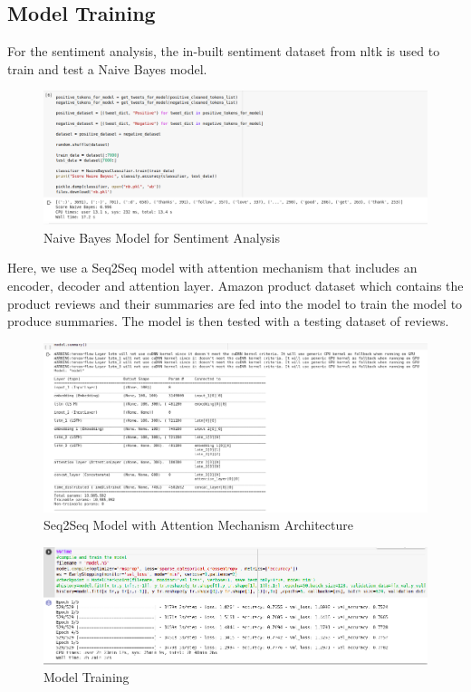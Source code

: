 \documentclass[11pt]{report}
\begin{document}
\subsection{Model Training}
For the sentiment analysis, the in-built sentiment dataset from nltk is used to train and test a Naive Bayes model.
\begin{figure}[H]
\centering
\includegraphics[scale=0.35]{images/sentiment_modeltraining.png}
\caption{Naive Bayes Model for Sentiment Analysis}
\label{fig:sentiment_train}
\end{figure}
Here, we use a Seq2Seq model with attention mechanism that includes an encoder, decoder and attention layer. Amazon product dataset which contains the product reviews and their summaries are fed into the model to train the model to produce summaries. The model is then tested with a testing dataset of reviews.
\begin{figure}[H]
\centering
\includegraphics[scale=0.45]{images/model_training1.png}
\caption{Seq2Seq Model with Attention Mechanism Architecture}
\label{fig:train}
\end{figure}

\begin{figure}[H]
\centering
\includegraphics[scale=0.5]{images/model_training0.png}
\caption{Model Training}
\label{fig:train}
\end{figure}
\end{document}

